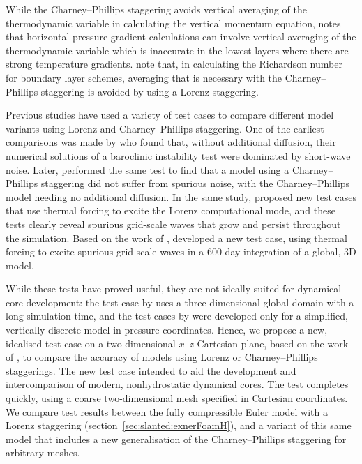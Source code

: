 While the Charney--Phillips staggering avoids vertical averaging of the thermodynamic variable in calculating the vertical momentum equation, \citet{davies2005} notes that horizontal pressure gradient calculations can involve vertical averaging of the thermodynamic variable which is inaccurate in the lowest layers where there are strong temperature gradients.
\citet{holdaway2013a} note that, in calculating the Richardson number for boundary layer schemes, averaging that is necessary with the Charney--Phillips staggering is avoided by using a Lorenz staggering.

Previous studies have used a variety of test cases to compare different model variants using Lorenz and Charney--Phillips staggering.
One of the earliest comparisons was made by \citet{arakawa-moorthi1988} who found that, without additional diffusion, their numerical solutions of a baroclinic instability test were dominated by short-wave noise.
Later, \citet{arakawa-konor1996} performed the same test to find that a model using a Charney--Phillips staggering did not suffer from spurious noise, with the Charney--Phillips model needing no additional diffusion.
In the same study, \citet{arakawa-konor1996} proposed new test cases that use thermal forcing to excite the Lorenz computational mode, and these tests clearly reveal spurious grid-scale waves that grow and persist throughout the simulation.
Based on the work of \citet{arakawa-konor1996}, \citet{untch-hortal2004} developed a new test case, using thermal forcing to excite spurious grid-scale waves in a 600-day integration of a global, 3D model.

While these tests have proved useful, they are not ideally suited for dynamical core development: the test case by \citet{untch-hortal2004} uses a three-dimensional global domain with a long simulation time, and the test cases by \citet{arakawa-konor1996} were developed only for a simplified, vertically discrete model in pressure coordinates.
Hence, we propose a new, idealised test case on a two-dimensional $x$--$z$ Cartesian plane, based on the work of \citet{arakawa-konor1996}, to compare the accuracy of models using Lorenz or Charney--Phillips staggerings.
The new test case intended to aid the development and intercomparison of modern, nonhydrostatic dynamical cores.  The test completes quickly, using a coarse two-dimensional mesh specified in Cartesian coordinates.
We compare test results between the fully compressible Euler model with a Lorenz staggering (section~\ref{sec:slanted:exnerFoamH}), and a variant of this same model that includes a new generalisation of the Charney--Phillips staggering for arbitrary meshes.

